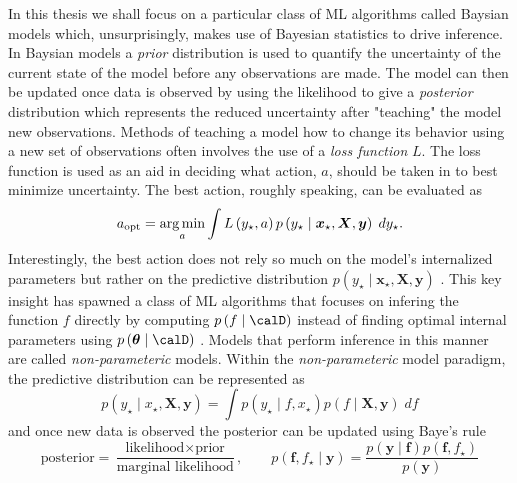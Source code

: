 In this thesis we shall focus on a particular class of ML algorithms called Baysian models which, unsurprisingly, makes use of Bayesian statistics to drive inference. In Baysian models a {\it prior} distribution is used to quantify the uncertainty of the current state of the model before any observations are made. The model can then be updated once data is observed by using the likelihood to give a {\it posterior} distribution which represents the reduced uncertainty after "teaching" the model new observations. Methods of teaching a model how to change its behavior using a new set of observations often involves the use of a {\it loss function} $L$. The loss function is used as an aid in deciding what action, $a$, should be taken in to best minimize uncertainty. The best action, roughly speaking, can be evaluated as
\begin{equation*}
    a_{\text{opt}} =  \operatorname*{\arg\min}_{a} \int L \left( y_{\star} , a \right) p \left( y_{\star} \mid \bm{x}_{\star}, \bm{X}, \bm{y} \right) \; d y_{\star}.
\end{equation*}
Interestingly, the best action does not rely so much on the model's internalized parameters but rather on the predictive distribution $p \left( y_{\star} \mid \bm{x}_{\star}, \bm{X}, \bm{y} \right)$ \cite{van2019sparse}. This key insight has spawned a class of ML algorithms that focuses on infering the function $f$ directly by computing $p \left( f \mid \calD \right)$ instead of finding optimal internal parameters using $p \left( \bm{\theta} \mid \calD \right)$ \cite{MurphyKevinP2012Ml}. Models that perform inference in this manner are called {\it non-parameteric} models. Within the {\it non-parameteric} model paradigm, the predictive distribution can be represented as
\begin{equation*}
    p \left( y_{\star} \mid x_{\star} , \bm{X} , \bm{y} \right) = \int p \left( y_{\star} \mid f , x_{\star} \right) p \left( f \mid \bm{X} , \bm{y} \right) \; df
\end{equation*}
and once new data is observed the posterior can be updated using Baye's rule
\begin{equation*}
    \text{posterior} = \frac{\text{likelihood} \times \text{prior}}{\text{marginal likelihood}}, \qquad p \left( \bm{f} , f_{\star} \mid \bm{y} \right) = \frac{p \left( \bm{y} \mid \bm{f} \right) p \left( \bm{f} , f_{\star} \right) }{p \left( \bm{y} \right)}
\end{equation*}
